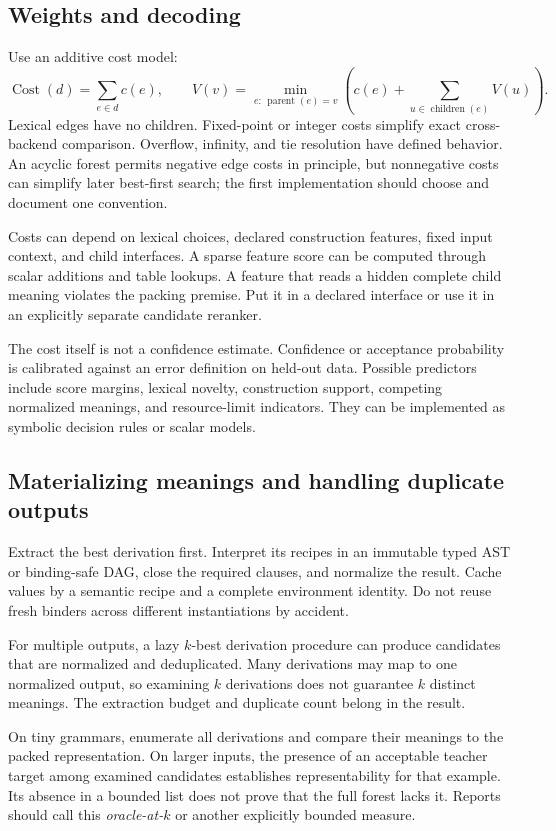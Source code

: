 \documentclass[11pt,a4paper]{article}
\newcommand{\Cost}{\operatorname{Cost}}
\begin{document}
\subsection{Weights and decoding}
Use an additive cost model:
\[
  \Cost(d)=\sum_{e\in d}c(e),\qquad
  V(v)=\min_{e:\,\operatorname{parent}(e)=v}
           \left(c(e)+\sum_{u\in\operatorname{children}(e)}V(u)\right).
\]
Lexical edges have no children. Fixed-point or integer costs simplify exact
cross-backend comparison. Overflow, infinity, and tie resolution have
defined behavior. An acyclic forest permits negative edge costs in principle,
but nonnegative costs can simplify later best-first search; the first
implementation should choose and document one convention.

Costs can depend on lexical choices, declared construction features,
fixed input context, and child interfaces. A sparse feature score can be
computed through scalar additions and table lookups. A feature that reads
a hidden complete child meaning violates the packing premise. Put it in a
declared interface or use it in an explicitly separate candidate reranker.

The cost itself is not a confidence estimate. Confidence or acceptance
probability is calibrated against an error definition on held-out data.
Possible predictors include score margins, lexical novelty, construction
support, competing normalized meanings, and resource-limit indicators.
They can be implemented as symbolic decision rules or scalar models.

\subsection{Materializing meanings and handling duplicate outputs}
Extract the best derivation first. Interpret its recipes in an immutable
typed AST or binding-safe DAG, close the required clauses, and normalize the
result. Cache values by a semantic recipe and a complete environment identity.
Do not reuse fresh binders across different instantiations by accident.

For multiple outputs, a lazy \(k\)-best derivation procedure can produce
candidates that are normalized and deduplicated. Many derivations may map to
one normalized output, so examining \(k\) derivations does not guarantee
\(k\) distinct meanings. The extraction budget and duplicate count belong
in the result.

On tiny grammars, enumerate all derivations and compare their meanings to
the packed representation. On larger inputs, the presence of an acceptable
teacher target among examined candidates establishes representability for
that example. Its absence in a bounded list does not prove that the full
forest lacks it. Reports should call this \emph{oracle-at-\(k\)} or another
explicitly bounded measure.
\end{document}
